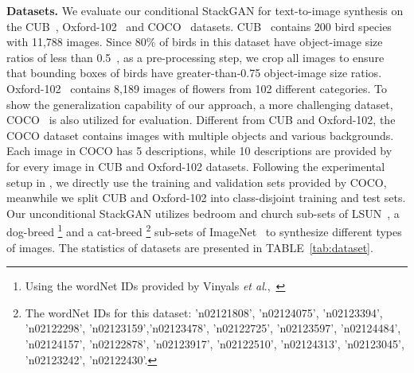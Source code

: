 \documentclass[10pt,journal,letterpaper,compsoc]{IEEEtran}
\begin{document}
\textbf{Datasets. }
{ 
We evaluate our conditional StackGAN for text-to-image synthesis on the CUB~\cite{WahCUB_200_2011},  Oxford-102~\cite{Nilsback08} and COCO~\cite{LinMBHPRDZ14} datasets. CUB~\cite{WahCUB_200_2011} contains 200 bird species with 11,788 images. Since 80\% of birds in this dataset have object-image size ratios of less than 0.5~\cite{WahCUB_200_2011}, as a pre-processing step, we crop all images to ensure that bounding boxes of birds have greater-than-0.75 object-image size ratios. Oxford-102~\cite{Nilsback08} contains 8,189 images of flowers from 102 different categories.  To show the generalization capability of our approach, a more challenging dataset, COCO~\cite{LinMBHPRDZ14} is also utilized for evaluation. Different from CUB and Oxford-102, the COCO dataset contains images with multiple objects and various backgrounds. Each image in COCO has 5 descriptions, while 10 descriptions are provided by \cite{reed2016cvpr} for every image in CUB and Oxford-102 datasets. Following the experimental setup in \cite{reed2016generative}, we directly use the training and validation sets provided by COCO, meanwhile we split CUB and Oxford-102 into class-disjoint training and test sets. Our unconditional StackGAN utilizes bedroom and church sub-sets of LSUN~\cite{yu15lsun}, a dog-breed  \footnote{Using the wordNet IDs provided by Vinyals \emph{et al}.,~\cite{VinyalsBLKW16}} and  a cat-breed \footnote{The wordNet IDs for this dataset: 'n02121808', 'n02124075', 'n02123394', 'n02122298', 'n02123159','n02123478', 'n02122725', 'n02123597', 'n02124484', 'n02124157', 'n02122878', 'n02123917', 'n02122510', 'n02124313', 'n02123045', 'n02123242', 'n02122430'.} sub-sets of ImageNet~\cite{ILSVRC15} to synthesize different types of images. The statistics of datasets are presented in TABLE~\ref{tab:dataset}. 
}
\end{document}
